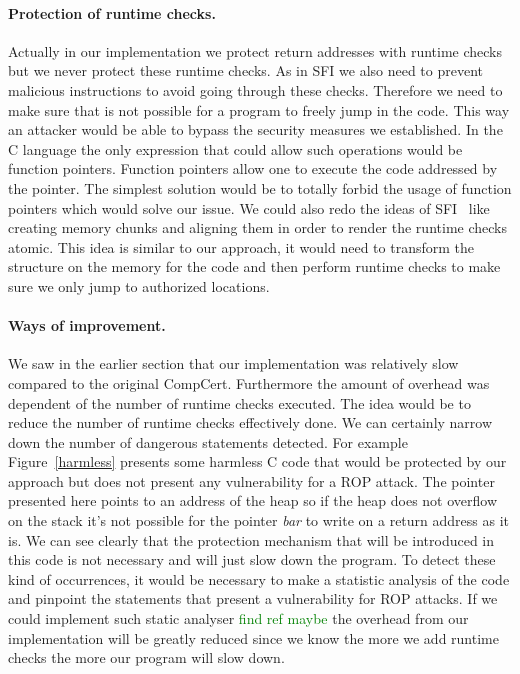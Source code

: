 \documentclass[11pt]{sdm}
\begin{document}

\paragraph{Protection of runtime checks.}
\label{par:Protection of runtime checks}
Actually in our implementation we protect return addresses with runtime checks but we never protect these runtime checks. As in SFI we also need to prevent malicious instructions to avoid going through these checks. Therefore we need to make sure that is not possible for a program to freely jump in the code. This way an attacker would be able to bypass the security measures we established.
In the C language the only expression that could allow such operations would be function pointers. Function pointers allow one to execute the code addressed by the pointer.
The simplest solution would be to totally forbid the usage of function pointers which would solve our issue.
We could also redo the ideas of SFI~\cite{Mccamant_evaluatingsfi} like creating memory chunks and aligning them in order to render the runtime checks atomic. This idea is similar to our approach, it would need to transform the structure on the memory for the code and then perform runtime checks to make sure we only jump to authorized locations.

\paragraph{Ways of improvement.}
\label{par:Ways of improvement.}
We saw in the earlier section that our implementation was relatively slow compared to the original CompCert. Furthermore the amount of overhead was dependent of the number of runtime checks executed.
The idea would be to reduce the number of runtime checks effectively done.
We can certainly narrow down the number of dangerous statements detected. For example Figure~\ref{harmless} presents some harmless C code that would be protected by our approach but does not present any vulnerability for a ROP attack. The pointer presented here points to an address of the heap so if the heap does not overflow on the stack it's not possible for the pointer \textit{bar} to write on a return address as it is.
We can see clearly that the protection mechanism that will be introduced in this code is not necessary and will just slow down the program.
To detect these kind of occurrences, it would be necessary to make a statistic analysis of the code and pinpoint the statements that present a vulnerability for ROP attacks.
If we could implement such static analyser \textcolor{green}{find ref maybe} the overhead from our implementation will be greatly reduced since we know the more we add runtime checks the more our program will slow down.
\end{document}
